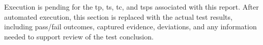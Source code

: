 Execution is pending for the \gls{tp}, \gls{ts}, \gls{tc}, and \glspl{tsp}
associated with this report.  After automated execution, this section is
replaced with the actual test results, including pass/fail outcomes, captured
evidence, deviations, and any information needed to support review of the test
conclusion.

